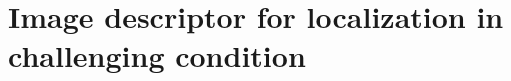 \documentclass[thesis.tex]{subfiles}
\begin{document}
\acresetall

\graphicspath{{3_side_modality_learning_for_localisation/figures/}}

\chapter[Localization in challenging condition]{Image descriptor for localization in challenging condition}\label{chap:3}










\end{document}
